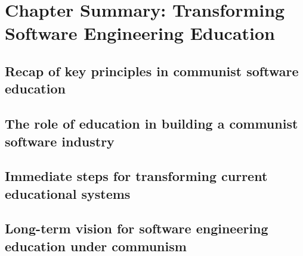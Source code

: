 \newpage

\section{Chapter Summary: Transforming Software Engineering Education}
\subsection{Recap of key principles in communist software education}
\subsection{The role of education in building a communist software industry}
\subsection{Immediate steps for transforming current educational systems}
\subsection{Long-term vision for software engineering education under communism}